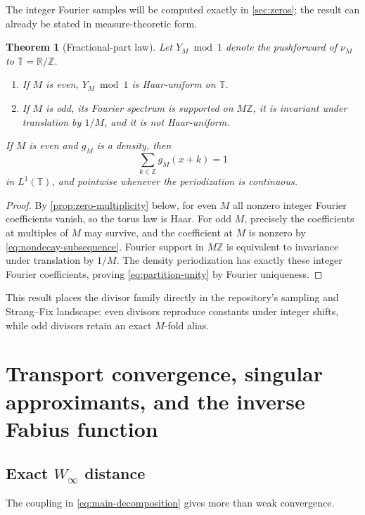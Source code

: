 \documentclass[11pt,oneside]{article}
\newtheorem{theorem}{Theorem}[section]
\theoremstyle{definition}
\theoremstyle{remark}
\newcommand{\R}{\mathbb R}
\newcommand{\Z}{\mathbb Z}
\numberwithin{equation}{section}
\newcommand{\T}{\mathbb T}
\newcommand{\1}{\mathbf 1}
\begin{document}
The integer Fourier samples will be computed exactly in \cref{sec:zeros}; the result can
already be stated in measure-theoretic form.

\begin{theorem}[Fractional-part law]
\label{thm:torus}
Let $Y_M\bmod1$ denote the pushforward of $\nu_M$ to $\T=\R/\Z$.
\begin{enumerate}
\item If $M$ is even, $Y_M\bmod1$ is Haar-uniform on $\T$.
\item If $M$ is odd, its Fourier spectrum is supported on $M\Z$, it is invariant under
translation by $1/M$, and it is not Haar-uniform.
\end{enumerate}
If $M$ is even and $g_M$ is a density, then
\begin{equation}
 \sum_{k\in\Z}g_M(x+k)=1
 \label{eq:partition-unity}
\end{equation}
in $L^1(\T)$, and pointwise whenever the periodization is continuous.
\end{theorem}

\begin{proof}
By \cref{prop:zero-multiplicity} below, for even $M$ all nonzero integer Fourier
coefficients vanish, so the torus law is Haar.  For odd $M$, precisely the coefficients at
multiples of $M$ may survive, and the coefficient at $M$ is nonzero by
\eqref{eq:nondecay-subsequence}.  Fourier support in $M\Z$ is equivalent to invariance
under translation by $1/M$.  The density periodization has exactly these integer Fourier
coefficients, proving \eqref{eq:partition-unity} by Fourier uniqueness.
\end{proof}

This result places the divisor family directly in the repository's sampling and
Strang--Fix landscape: even divisors reproduce constants under integer shifts, while odd
divisors retain an exact $M$-fold alias.

\section{Transport convergence, singular approximants, and the inverse Fabius function}
\label{sec:transport-inverse}

\subsection{Exact $W_\infty$ distance}

The coupling in \eqref{eq:main-decomposition} gives more than weak convergence.
\end{document}
